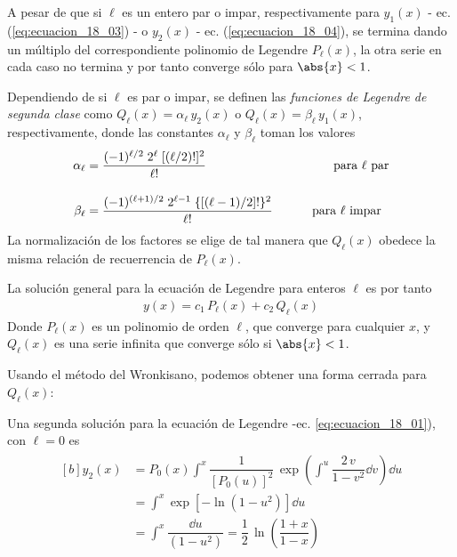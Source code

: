 A pesar de que si $\ell$ es un entero par o impar, respectivamente para $y_{1}(x)$ - ec. (\ref{eq:ecuacion_18_03}) - o $y_{2}(x)$ - ec. (\ref{eq:ecuacion_18_04}), se termina dando un múltiplo del correspondiente polinomio de Legendre $P_{\ell}(x)$, la otra serie en cada caso no termina y por tanto converge sólo para $\abs{x} < 1$.
\par
Dependiendo de si $\ell$ es par o impar, se definen las \emph{funciones de Legendre de segunda clase} como $Q_{\ell}(x) =  \alpha_{\ell} \, y_{2}(x)$ o $Q_{\ell}(x) =  \beta_{\ell} \, y_{1}(x)$, respectivamente, donde las constantes $\alpha_{\ell}$ y $\beta_{\ell}$ toman los valores
\begin{align}
\alpha_{\ell} &= \dfrac{(-1)^{\ell/2} \; 2^{\ell} \; [(\ell / 2)!]^{2}}{\ell!} \hspace{3.5cm} \mbox{ para $\ell$ par} \label{eq:ecuacion_18_05}\\[1em]
\beta_{\ell} &= \dfrac{(-1)^{(\ell + 1)/2} \; 2^{\ell - 1} \; \lbrace \left[ (\ell - 1) /2 \right] ! \rbrace^{2}}{\ell!} \hspace{1cm} \mbox{ para $\ell$ impar} \label{eq:ecuacion_18_06}
\end{align}
La normalización de los factores se elige de tal manera que $Q_{\ell}(x)$ obedece la misma relación de recuerrencia de $P_{\ell}(x)$.
\par
La solución general para la ecuación de Legendre para enteros $\ell$ es por tanto
\begin{align}
y(x) = c_{1} \, P_{\ell}(x) + c_{2} \, Q_{\ell} (x) 
\label{eq:ecuacion_18_07}
\end{align}
Donde $P_{\ell}(x)$ es un polinomio de orden $\ell$, que converge para cualquier $x$, y $Q_{\ell}(x)$ es una serie infinita que converge sólo si $\abs{x} < 1$.
\par
Usando el método del Wronkisano, podemos obtener una forma cerrada para $Q_{\ell}(x)$:
\par
Una segunda solución para la ecuación de Legendre -ec. \ref{eq:ecuacion_18_01}), con $\ell = 0$ es
\begin{align}
\begin{aligned}[b]
y_{2}(x) &= P_{0}(x) \int^{x} \dfrac{1}{[P_{0}(u)]^{2}} \, \exp \left( \int^{u} \dfrac{2 \, v}{1 - v^{2}} \dd{v} \right) \dd{u} \\[0.5em]
&= \int^{x} \exp [ - \ln (1 - u^{2}) ] \dd{u} \\[0.5em]
&= \int^{x} \dfrac{\dd{u}}{(1 - u^{2})} = \dfrac{1}{2} \, \ln \left( \dfrac{1 + x}{1 - x} \right)
\end{aligned}
\label{eq:ecuacion_18_08}
\end{align}
